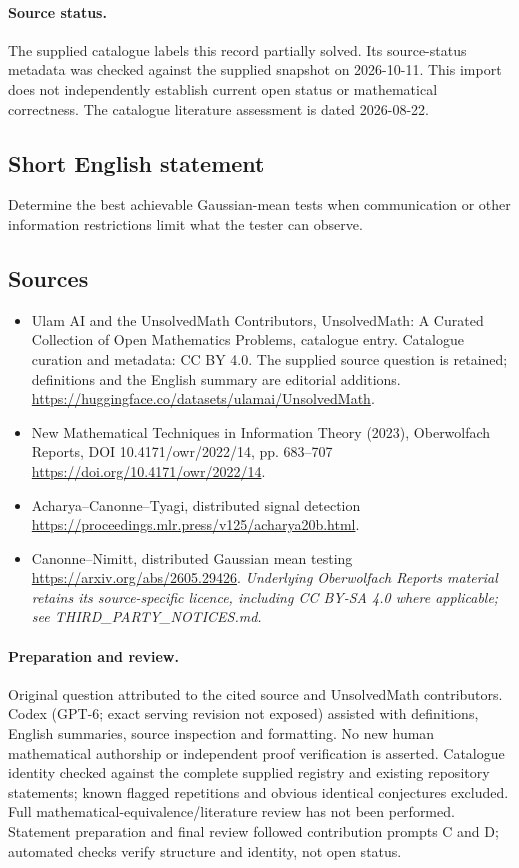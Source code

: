 \documentclass[11pt]{article}
\begin{document}
\paragraph{Source status.}
The supplied catalogue labels this record partially solved. Its source-status metadata was checked against the supplied snapshot on 2026-10-11. This import does not independently establish current open status or mathematical correctness. The catalogue literature assessment is dated 2026-08-22.
\subsection{Short English statement}
Determine the best achievable Gaussian-mean tests when communication or other information restrictions limit what the tester can observe.
\subsection{Sources}
\begin{itemize}
\item[S1] Ulam AI and the UnsolvedMath Contributors, UnsolvedMath: A Curated Collection of Open Mathematics Problems, catalogue entry. Catalogue curation and metadata: CC BY 4.0. The supplied source question is retained; definitions and the English summary are editorial additions.
\url{https://huggingface.co/datasets/ulamai/UnsolvedMath}.
\item[S2] New Mathematical Techniques in Information Theory (2023), Oberwolfach Reports, DOI 10.4171/owr/2022/14, pp. 683--707
\url{https://doi.org/10.4171/owr/2022/14}.
\item[S3] Acharya--Canonne--Tyagi, distributed signal detection
\url{https://proceedings.mlr.press/v125/acharya20b.html}.
\item[S4] Canonne--Nimitt, distributed Gaussian mean testing
\url{https://arxiv.org/abs/2605.29426}.
\textit{Underlying Oberwolfach Reports material retains its source-specific licence, including CC BY-SA 4.0 where applicable; see THIRD\_PARTY\_NOTICES.md.}
\end{itemize}
\paragraph{Preparation and review.}
Original question attributed to the cited source and UnsolvedMath contributors. Codex (GPT-6; exact serving revision not exposed) assisted with definitions, English summaries, source inspection and formatting. No new human mathematical authorship or independent proof verification is asserted. Catalogue identity checked against the complete supplied registry and existing repository statements; known flagged repetitions and obvious identical conjectures excluded. Full mathematical-equivalence/literature review has not been performed. Statement preparation and final review followed contribution prompts C and D; automated checks verify structure and identity, not open status.
\label{end:statement}
\end{document}
